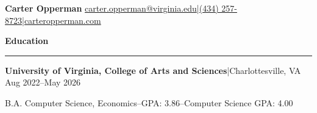 \documentclass[11pt,letterpaper]{article}
\newcommand{\horibar}[2]{#1\hspace{5pt}|\hspace{5pt}#2}
\newcommand{\sep}[1]{\par\vspace{#1}}
\renewenvironment{section}[1]{
\sep{11pt}
{
\fontsize{14}{2}
\selectfont
\textbf{#1}\\[0.5pt]
}
\sep{4pt}
\noindent\rule{\linewidth}{0.5pt}
\sep{4pt}
}
{
}
\begin{document}
{\fontsize{20}{1} \selectfont \textbf{Carter Opperman}} \hfill \horibar{\href{mailto:carter.opperman@virginia.edu}{carter.opperman@virginia.edu}}{\horibar{\href{tel:+14342578723}{(434) 257-8723}}{\href{https://carteropperman.com}{carteropperman.com}}}
\sep{5pt}

\begin{section}{Education}
    \sep{4pt}
    \horibar{\textbf{University of Virginia, College of Arts and Sciences}}{Charlottesville, VA} \hfill Aug 2022–May 2026
    \sep{4pt}
    \par\hspace{6pt}B.A. Computer Science, Economics\hspace{5pt}–\hspace{5pt}GPA: 3.86\hspace{5pt}–\hspace{5pt}Computer Science GPA: 4.00
    \sep{2pt}
\end{section}
\end{document}
